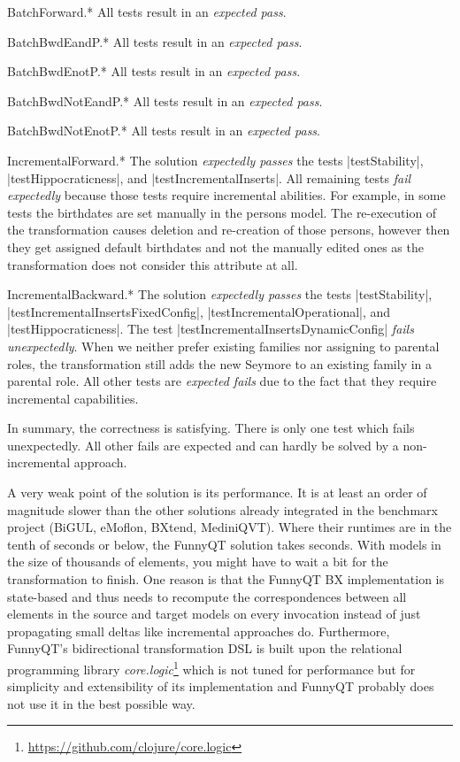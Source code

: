 \documentclass[a4paper]{article}
\newcommand{\code}{\clojureinline}
\begin{document}
\begin{compactdesc}
\item[BatchForward.*] All tests result in an \emph{expected pass}.
\item[BatchBwdEandP.*] All tests result in an \emph{expected pass}.
\item[BatchBwdEnotP.*] All tests result in an \emph{expected pass}.
\item[BatchBwdNotEandP.*] All tests result in an \emph{expected pass}.
\item[BatchBwdNotEnotP.*] All tests result in an \emph{expected pass}.
\item[IncrementalForward.*] The solution \emph{expectedly passes} the tests
  \code|testStability|, \code|testHippocraticness|, and
  \code|testIncrementalInserts|.  All remaining tests \emph{fail expectedly}
  because those tests require incremental abilities.  For example, in some
  tests the birthdates are set manually in the persons model.  The re-execution
  of the transformation causes deletion and re-creation of those persons,
  however then they get assigned default birthdates and not the manually edited
  ones as the transformation does not consider this attribute at all.
\item[IncrementalBackward.*] The solution \emph{expectedly passes} the tests
  \code|testStability|, \code|testIncrementalInsertsFixedConfig|,
  \code|testIncrementalOperational|, and \code|testHippocraticness|.  The test
  \code|testIncrementalInsertsDynamicConfig| \emph{fails unexpectedly}.  When
  we neither prefer existing families nor assigning to parental roles, the
  transformation still adds the new Seymore to an existing family in a parental
  role.  All other tests are \emph{expected fails} due to the fact that they
  require incremental capabilities.
\end{compactdesc}

In summary, the correctness is satisfying.  There is only one test which fails
unexpectedly.  All other fails are expected and can hardly be solved by a
non-incremental approach.

A very weak point of the solution is its performance.  It is at least an order
of magnitude slower than the other solutions already integrated in the
benchmarx project (BiGUL, eMoflon, BXtend, MediniQVT).  Where their runtimes
are in the tenth of seconds or below, the FunnyQT solution takes seconds.  With
models in the size of thousands of elements, you might have to wait a bit for
the transformation to finish.  One reason is that the FunnyQT BX implementation
is state-based and thus needs to recompute the correspondences between all
elements in the source and target models on every invocation instead of just
propagating small deltas like incremental approaches do.  Furthermore,
FunnyQT's bidirectional transformation DSL is built upon the relational
programming library
\emph{core.logic}\footnote{\url{https://github.com/clojure/core.logic}} which
is not tuned for performance but for simplicity and extensibility of its
implementation and FunnyQT probably does not use it in the best possible way.
\end{document}

